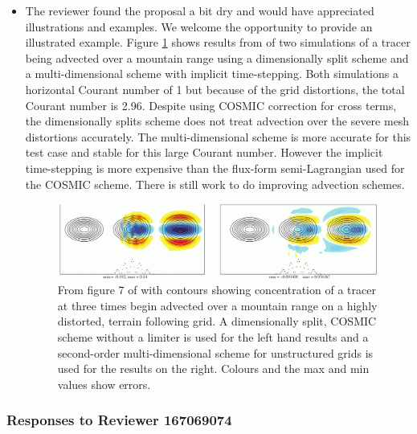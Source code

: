 \begin{itemize}
\item
The reviewer found the proposal a bit dry and would have appreciated illustrations and examples. We welcome the opportunity to provide an illustrated example. Figure \ref{fig:CWPS17_fig7} shows results from \cite{CWPS17} of two simulations of a tracer being advected over a mountain range using a dimensionally split scheme and a multi-dimensional scheme with implicit time-stepping. Both simulations a horizontal Courant number of 1 but because of the grid distortions, the total Courant number is 2.96. Despite using COSMIC correction for cross terms, the dimensionally splits scheme does not treat advection over the severe mesh distortions accurately. The multi-dimensional scheme is more accurate for this test case and stable for this large Courant number. However the implicit time-stepping is more expensive than the flux-form semi-Lagrangian used for the COSMIC scheme. There is still work to do improving advection schemes.

\begin{figure}
\includegraphics[width=\linewidth]{ChenFig7.png}
\caption{From figure 7 of \cite{CWPS17} with contours showing concentration of a tracer at three times begin advected over a mountain range on a highly distorted, terrain following grid. A dimensionally split, COSMIC scheme without a limiter is used for the left hand results and a second-order multi-dimensional scheme for unstructured grids is used for the results on the right. Colours and the max and min values show errors.}
\label{fig:CWPS17_fig7}
\end{figure}


\end{itemize}

\subsubsection*{Responses to Reviewer 167069074}


